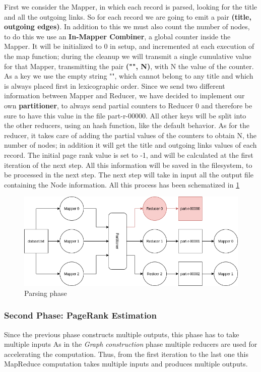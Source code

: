 \noindent First we consider the Mapper, in which each record is parsed, looking for the title and all the outgoing links. So for each record we are going to emit a pair \textbf{(title, outgoing edges)}. In addition to this we must also count the number of nodes, to do this we use an \textbf{In-Mapper Combiner}, a global counter inside the Mapper. It will be initialized to 0 in setup, and incremented at each execution of the map function; during the cleanup we will transmit a single cumulative value for that Mapper, transmitting the pair \textbf{("", N)}, with N the value of the counter. As a key we use the empty string "", which cannot belong to any title and which is always placed first in lexicographic order.
Since we send two different information between Mapper and Reducer, we have decided to implement our own \textbf{partitioner}, to always send partial counters to Reducer 0 and therefore be sure to have this value in the file part-r-00000. All other keys will be split into the other reducers, using an hash function, like the default behavior.
As for the reducer, it takes care of adding the partial values of the counters to obtain N, the number of nodes; in addition it will get the title and outgoing links values of each record. The initial page rank value is set to -1, and will be calculated at the first iteration of the next step. All this information will be saved in the filesystem, to be processed in the next step. The next step will take in input all the output file containing the Node information. All this process has been schematized in \ref{fig:parsingPhase}


\begin{figure}[H]
	\includegraphics[width=\textwidth]{img/ParserSchema.png}
	\caption{Parsing phase}
	\label{fig:parsingPhase}     
\end{figure}

\subsubsection{Second Phase: PageRank Estimation}
Since the previous phase constructs multiple outputs, this phase has to take multiple inputs
As in the \textit{Graph construction} phase multiple reducers are used for accelerating the computation. Thus, from the first iteration to the last one this MapReduce computation takes multiple inputs and produces multiple outputs.

